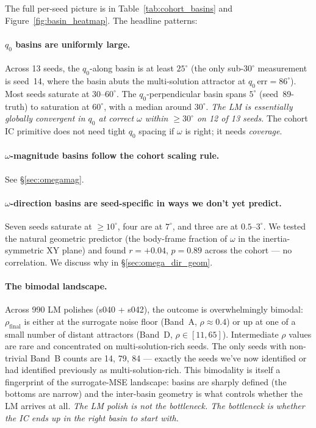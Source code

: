 \documentclass[11pt,a4paper]{article}
\begin{document}
The full per-seed picture is in Table~\ref{tab:cohort_basins} and Figure~\ref{fig:basin_heatmap}. The headline patterns:

\paragraph{$q_0$ basins are uniformly large.} Across 13 seeds, the $q_0$-along basin is at least $25^\circ$ (the only sub-$30^\circ$ measurement is seed~14, where the basin abuts the multi-solution attractor at $q_0\,\mathrm{err}{=}86^\circ$). Most seeds saturate at $30$--$60^\circ$. The $q_0$-perpendicular basin spans $5^\circ$ (seed~89-truth) to saturation at $60^\circ$, with a median around $30^\circ$. \emph{The LM is essentially globally convergent in $q_0$ at correct $\omega$ within $\geq 30^\circ$ on 12 of 13 seeds.} The cohort IC primitive does not need tight $q_0$ spacing if $\omega$ is right; it needs \emph{coverage}.

\paragraph{$\omega$-magnitude basins follow the cohort scaling rule.} See \S\ref{sec:omegamag}.

\paragraph{$\omega$-direction basins are seed-specific in ways we don't yet predict.} Seven seeds saturate at $\geq 10^\circ$, four are at $7^\circ$, and three are at $0.5\text{--}3^\circ$. We tested the natural geometric predictor (the body-frame fraction of $\omega$ in the inertia-symmetric XY plane) and found $r = +0.04$, $p = 0.89$ across the cohort --- no correlation. We discuss why in \S\ref{sec:omega_dir_geom}.

\paragraph{The bimodal landscape.} Across 990 LM polishes (s040 + s042), the outcome is overwhelmingly bimodal: $\rho_{\mathrm{final}}$ is either at the surrogate noise floor (Band~A, $\rho \approx 0.4$) or up at one of a small number of distant attractors (Band~D, $\rho \in [11, 65]$). Intermediate $\rho$ values are rare and concentrated on multi-solution-rich seeds. The only seeds with non-trivial Band~B counts are 14, 79, 84 --- exactly the seeds we've now identified or had identified previously as multi-solution-rich. This bimodality is itself a fingerprint of the surrogate-MSE landscape: basins are sharply defined (the bottoms are narrow) and the inter-basin geometry is what controls whether the LM arrives at all. \emph{The LM polish is not the bottleneck. The bottleneck is whether the IC ends up in the right basin to start with.}
\end{document}
